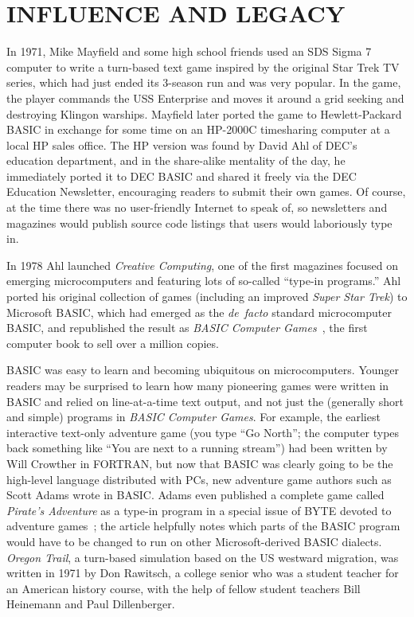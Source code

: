 

\section{INFLUENCE AND LEGACY}


In 1971, Mike Mayfield and some high school friends used an SDS Sigma 7
computer to write a turn-based text game inspired by the original Star
Trek TV series, which had just ended its 3-season run and was very
popular.
In the game, the player commands the USS Enterprise and moves it around
a grid seeking and destroying Klingon warships.
Mayfield later ported the game to Hewlett-Packard BASIC in exchange for
some time on an HP-2000C timesharing computer at a local HP sales
office.
The HP version was found by David Ahl of DEC's education department, and
in the share-alike mentality of the day, he immediately ported it to DEC
BASIC and shared it freely via the DEC Education
Newsletter, encouraging readers to submit their own games.
Of course, at the time there was no user-friendly Internet to speak of,
so newsletters and magazines would
publish source code listings that users would laboriously type in.

In 1978 Ahl launched \emph{Creative Computing}, one of the first
magazines focused on emerging microcomputers and featuring lots of
so-called ``type-in programs.''
Ahl ported his original collection of games (including an improved
\emph{Super Star Trek}) to Microsoft BASIC, which had emerged as the
\emph{de~facto} standard microcomputer BASIC, and republished the result
as \emph{BASIC Computer Games}~\cite{basic_computer_games}, the first
computer book to sell over a million copies.

BASIC was easy to learn and becoming ubiquitous on microcomputers.
Younger readers may be surprised to learn how many pioneering games were
written in BASIC and relied on line-at-a-time text output, and not just
the (generally short and simple) programs in \emph{BASIC Computer
Games}.
For example, the earliest interactive text-only adventure game (you type
``Go North''; the computer types back something like ``You are next to a
running stream'') had been written by Will Crowther in FORTRAN, but now
that BASIC was clearly going to be the high-level language distributed
with PCs, new adventure game authors such as Scott Adams wrote in BASIC.
Adams even published a complete game called \emph{Pirate's Adventure} as
a type-in program in a special issue of BYTE devoted to adventure
games~\cite{byte80:adventure}; the article helpfully notes which parts
of the BASIC program would have to be changed to run on other
Microsoft-derived BASIC dialects.
\emph{Oregon Trail}, a turn-based simulation based on the US westward
migration, was written in 1971 by Don Rawitsch, a college senior who was
a student teacher for an American history course, with the help of
fellow student teachers Bill Heinemann and Paul Dillenberger.

